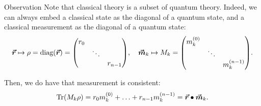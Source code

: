 \documentclass[a4paper]{article}
\begin{document}
\begin{parag}{Observation}
    Note that classical theory is a subset of quantum theory. Indeed, we can always embed a classical state as the diagonal of a quantum state, and a classical measurement as the diagonal of a quantum state: 
    \[\bvec{r} \mapsto \rho = \text{diag}\left(\bvec{r}\right) = \begin{pmatrix} r_0 &  &  \\  & \ddots &  \\  &  & r_{n-1} \end{pmatrix}, \mathspace \bvec{m}_k \mapsto M_k = \begin{pmatrix} m_k^{\left(0\right)} &  &  \\  & \ddots &  \\  &  & m_k^{\left(n-1\right)} \end{pmatrix}.\]

    Then, we do have that measurement is consistent: 
    \[\Tr\left(M_k \rho\right) = r_0 m_k^{\left(0\right)} + \ldots + r_{n-1} m_k^{\left(n-1\right)} = \bvec{r} \dotprod \bvec{m}_k.\]
\end{parag}
\end{document}
